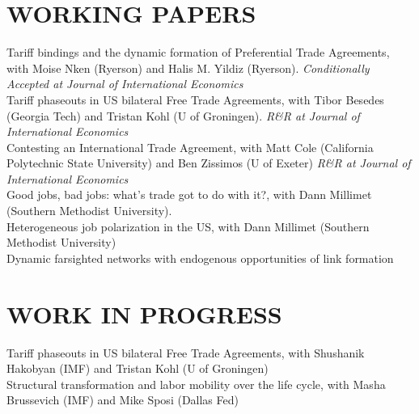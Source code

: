 \documentclass[11pt]{res}
\begin{document}
\begin{resume}
\section{WORKING PAPERS}\vspace{1.5mm}
{Tariff bindings and the dynamic formation of Preferential Trade Agreements}, with Moise Nken (Ryerson) and Halis M. Yildiz (Ryerson). \emph{Conditionally Accepted at Journal of International Economics}\vspace{1.5mm}\\
Tariff phaseouts in US bilateral Free Trade Agreements, with Tibor Besedes (Georgia Tech) and Tristan Kohl (U of Groningen). \emph{R\&R at Journal of International Economics}\vspace{1.5mm}\\
{Contesting an International Trade Agreement}, with Matt Cole (California Polytechnic State University) and Ben Zissimos (U of Exeter) \emph{R\&R at Journal of International Economics}\vspace{1.5mm}\\
{Good jobs, bad jobs: what's trade got to do with it?}, with Dann Millimet (Southern Methodist University).\vspace{1.5mm}\\
{Heterogeneous job polarization in the US}, with Dann Millimet (Southern Methodist University)\vspace{1.5mm}\\
{Dynamic farsighted networks with endogenous opportunities of link formation}

\section{WORK IN PROGRESS}\vspace{1.5mm}
Tariff phaseouts in US bilateral Free Trade Agreements, with Shushanik Hakobyan (IMF) and Tristan Kohl (U of Groningen)\vspace{1.5mm}\\
Structural transformation and labor mobility over the life cycle, with Masha Brussevich (IMF) and Mike Sposi (Dallas Fed)\vspace{1.5mm}\\



\end{resume}
\end{document}
